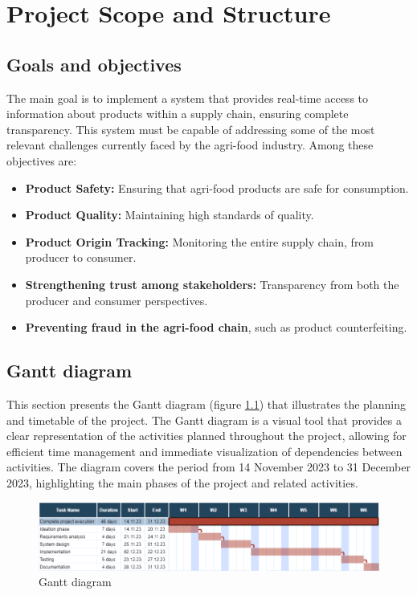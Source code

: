 \chapter{Project Scope and Structure}

\section{Goals and objectives}
The main goal is to implement a system that provides real-time access to information about products within a supply chain, ensuring complete transparency. This system must be capable of addressing some of the most relevant challenges currently faced by the agri-food industry. Among these objectives are:
\begin{itemize}
    \item \textbf{Product Safety:} Ensuring that agri-food products are safe for consumption.
    \item \textbf{Product Quality:} Maintaining high standards of quality.
    \item \textbf{Product Origin Tracking:} Monitoring the entire supply chain, from producer to consumer.
    \item \textbf{Strengthening trust among stakeholders:} Transparency from both the producer and consumer perspectives.
    \item \textbf{Preventing fraud in the agri-food chain}, such as product counterfeiting.
\end{itemize}


\section{Gantt diagram}
This section presents the Gantt diagram (figure \ref{Gantt}) that illustrates the planning and timetable of the project. The Gantt diagram is a visual tool that provides a clear representation of the activities planned throughout the project, allowing for efficient time management and immediate visualization of dependencies between activities. The diagram covers the period from 14 November 2023 to 31 December 2023, highlighting the main phases of the project and related activities.

\begin{figure}[ht]
    \centering
    \captionsetup[]{width=\textwidth}
    \includegraphics[width=1\textwidth, height=0.25\textwidth, scale=1]{img/Gantt.png}
    \caption{Gantt diagram}
    \label{Gantt}
\end{figure}

